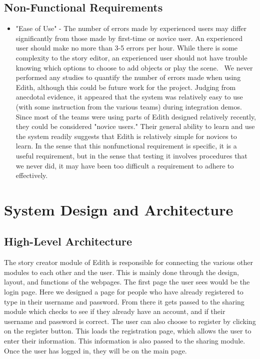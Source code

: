 \documentclass[12pt]{article}
\begin{document}
\subsection{Non-Functional Requirements}

\begin{itemize}

\item "Ease of Use" - 	The number of errors made by experienced users may differ significantly from those made by first-time or novice user. An experienced user should make no more than 3-5 errors per hour. While there is some complexity to the story editor, an experienced user should not have trouble knowing which options to choose to add objects or play the scene.
\ We never performed any studies to quantify the number of errors made when using Edith, although this could be future work for the project. Judging from anecdotal evidence, it appeared that the system was relatively easy to use (with some instruction from the various teams) during integration demos. Since most of the teams were using parts of Edith designed relatively recently, they could be considered "novice users." Their general ability to learn and use the system readily suggests that Edith is relatively simple for novices to learn. In the sense that this nonfunctional requirement is specific, it is a useful requirement, but in the sense that testing it involves procedures that we never did, it may have been too difficult a requirement to adhere to effectively.

\end{itemize}
\section{System Design and Architecture}

\subsection{High-Level Architecture}
The story creator module of Edith is responsible for connecting the various other modules to each other and the user. This is mainly done through the design, layout, and functions of the webpages. The first page the user sees would be the login page. Here we designed a page for people who have already registered to type in their username and password. From there it gets passed to the sharing module which checks to see if they already have an account, and if their username and password is correct. The user can also choose to register by clicking on the register button. This loads the registration page, which allows the user to enter their information. This information is also passed to the sharing module. Once the user has logged in, they will be on the main page. \\
\end{document}
